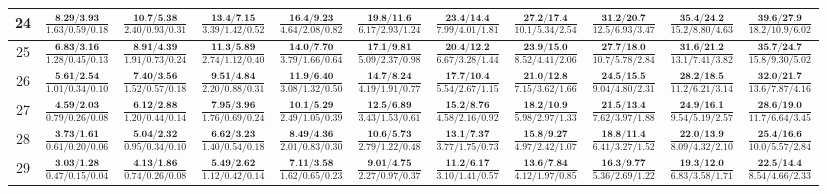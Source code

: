 \documentclass{slides}
\begin{document}
{{{\begin{tabular}{|c|c|c|c|c|c|c|c|c|c|c|}
\hline
24 & $\frac{\textbf{8.29/3.93}}{1.63/0.59/0.18}$ & $\frac{\textbf{10.7/5.38}}{2.40/0.93/0.31}$ & $\frac{\textbf{13.4/7.15}}{3.39/1.42/0.52}$ & $\frac{\textbf{16.4/9.23}}{4.64/2.08/0.82}$ & $\frac{\textbf{19.8/11.6}}{6.17/2.93/1.24}$ & $\frac{\textbf{23.4/14.4}}{7.99/4.01/1.81}$ & $\frac{\textbf{27.2/17.4}}{10.1/5.34/2.54}$ & $\frac{\textbf{31.2/20.7}}{12.5/6.93/3.47}$ & $\frac{\textbf{35.4/24.2}}{15.2/8.80/4.63}$ & $\frac{\textbf{39.6/27.9}}{18.2/10.9/6.02}$ \\
\hline
25 & $\frac{\textbf{6.83/3.16}}{1.28/0.45/0.13}$ & $\frac{\textbf{8.91/4.39}}{1.91/0.73/0.24}$ & $\frac{\textbf{11.3/5.89}}{2.74/1.12/0.40}$ & $\frac{\textbf{14.0/7.70}}{3.79/1.66/0.64}$ & $\frac{\textbf{17.1/9.81}}{5.09/2.37/0.98}$ & $\frac{\textbf{20.4/12.2}}{6.67/3.28/1.44}$ & $\frac{\textbf{23.9/15.0}}{8.52/4.41/2.06}$ & $\frac{\textbf{27.7/18.0}}{10.7/5.78/2.84}$ & $\frac{\textbf{31.6/21.2}}{13.1/7.41/3.82}$ & $\frac{\textbf{35.7/24.7}}{15.8/9.30/5.02}$ \\
\hline
26 & $\frac{\textbf{5.61/2.54}}{1.01/0.34/0.10}$ & $\frac{\textbf{7.40/3.56}}{1.52/0.57/0.18}$ & $\frac{\textbf{9.51/4.84}}{2.20/0.88/0.31}$ & $\frac{\textbf{11.9/6.40}}{3.08/1.32/0.50}$ & $\frac{\textbf{14.7/8.24}}{4.19/1.91/0.77}$ & $\frac{\textbf{17.7/10.4}}{5.54/2.67/1.15}$ & $\frac{\textbf{21.0/12.8}}{7.15/3.62/1.66}$ & $\frac{\textbf{24.5/15.5}}{9.04/4.80/2.31}$ & $\frac{\textbf{28.2/18.5}}{11.2/6.21/3.14}$ & $\frac{\textbf{32.0/21.7}}{13.6/7.87/4.16}$ \\
\hline
27 & $\frac{\textbf{4.59/2.03}}{0.79/0.26/0.08}$ & $\frac{\textbf{6.12/2.88}}{1.20/0.44/0.14}$ & $\frac{\textbf{7.95/3.96}}{1.76/0.69/0.24}$ & $\frac{\textbf{10.1/5.29}}{2.49/1.05/0.39}$ & $\frac{\textbf{12.5/6.89}}{3.43/1.53/0.61}$ & $\frac{\textbf{15.2/8.76}}{4.58/2.16/0.92}$ & $\frac{\textbf{18.2/10.9}}{5.98/2.97/1.33}$ & $\frac{\textbf{21.5/13.4}}{7.62/3.97/1.88}$ & $\frac{\textbf{24.9/16.1}}{9.54/5.19/2.57}$ & $\frac{\textbf{28.6/19.0}}{11.7/6.64/3.45}$ \\
\hline
28 & $\frac{\textbf{3.73/1.61}}{0.61/0.20/0.06}$ & $\frac{\textbf{5.04/2.32}}{0.95/0.34/0.10}$ & $\frac{\textbf{6.62/3.23}}{1.40/0.54/0.18}$ & $\frac{\textbf{8.49/4.36}}{2.01/0.83/0.30}$ & $\frac{\textbf{10.6/5.73}}{2.79/1.22/0.48}$ & $\frac{\textbf{13.1/7.37}}{3.77/1.75/0.73}$ & $\frac{\textbf{15.8/9.27}}{4.97/2.42/1.07}$ & $\frac{\textbf{18.8/11.4}}{6.41/3.27/1.52}$ & $\frac{\textbf{22.0/13.9}}{8.09/4.32/2.10}$ & $\frac{\textbf{25.4/16.6}}{10.0/5.57/2.84}$ \\
\hline
29 & $\frac{\textbf{3.03/1.28}}{0.47/0.15/0.04}$ & $\frac{\textbf{4.13/1.86}}{0.74/0.26/0.08}$ & $\frac{\textbf{5.49/2.62}}{1.12/0.42/0.14}$ & $\frac{\textbf{7.11/3.58}}{1.62/0.65/0.23}$ & $\frac{\textbf{9.01/4.75}}{2.27/0.97/0.37}$ & $\frac{\textbf{11.2/6.17}}{3.10/1.41/0.57}$ & $\frac{\textbf{13.6/7.84}}{4.12/1.97/0.85}$ & $\frac{\textbf{16.3/9.77}}{5.36/2.69/1.22}$ & $\frac{\textbf{19.3/12.0}}{6.83/3.58/1.71}$ & $\frac{\textbf{22.5/14.4}}{8.54/4.66/2.33}$ \\

\end{tabular}}}}
\end{document}
